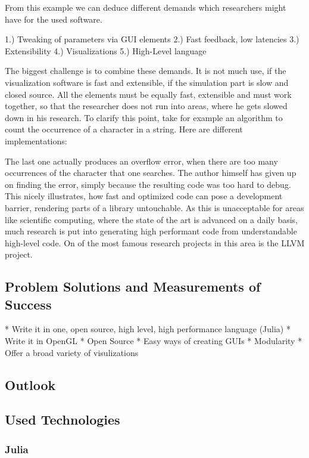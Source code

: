 From this example we can deduce different demands which researchers might have for the used software.

1.) Tweaking of parameters via GUI elements
2.) Fast feedback, low latencies
3.) Extensibility
4.) Visualizations
5.) High-Level language

The biggest challenge is to combine these demands. It is not much use, if the visualization software is fast and extensible, if the simulation part is slow and closed source. All the elements must be equally fast, extensible and must work together, so that the researcher does not run into areas, where he gets slowed down in his research.
To clarify this point, take for example an algorithm to count the occurrence of a character in a string.
Here are different implementations:


The last one actually produces an overflow error, when there are too many occurrences of the character that one searches.
The author himself has given up on finding the error, simply because the resulting code was too hard to debug.
This nicely illustrates, how fast and optimized code can pose a development barrier, rendering parts of a library untouchable.
As this is unacceptable for areas like scientific computing, where the state of the art is advanced on a daily basis, much research is put into generating high performant code from understandable high-level code.
On of the most famous research projects in this area is the LLVM project.



\subsection{Problem Solutions and Measurements of Success}
* Write it in one, open source, high level, high performance language (Julia)
* Write it in OpenGL
* Open Source
* Easy ways of creating GUIs
* Modularity
* Offer a broad variety of visulizations


\subsection{Outlook}

\subsection{Used Technologies}

\subsubsection{Julia}
